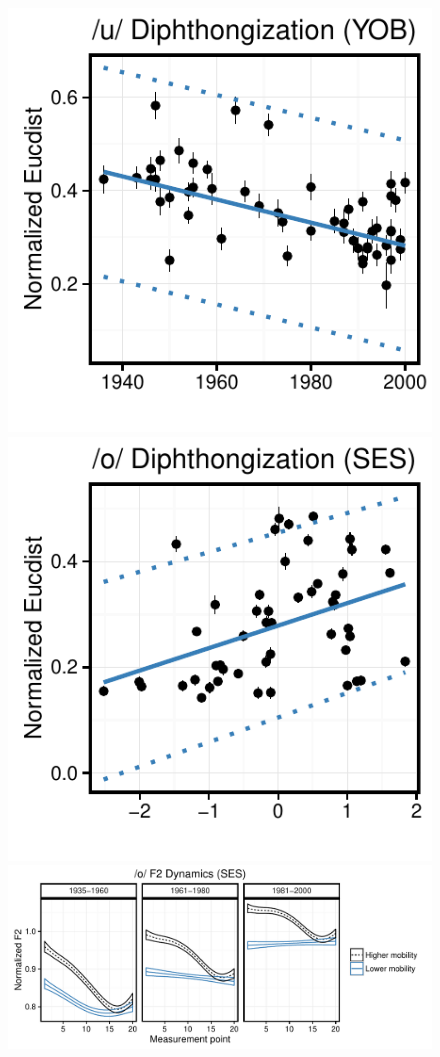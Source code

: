 \documentclass[a0,portrait]{a0poster}
\begin{document}
\begin{multicols}{3}
\begin{figure}[H]
\includegraphics[scale=1.65]{u_dip_yob.pdf}\includegraphics[scale=1.65]{o_dip_soc.pdf}
\includegraphics[scale=1.65]{owdynamicsclassh.pdf}
\end{figure}

\end{multicols}
\end{document}
